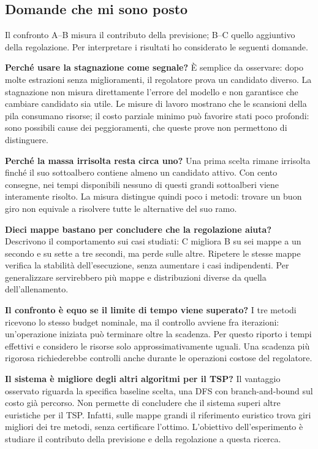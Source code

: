 \subsection*{Domande che mi sono posto}

Il confronto A--B misura il contributo della previsione; B--C quello
aggiuntivo della regolazione. Per interpretare i risultati ho considerato
le seguenti domande.

\textbf{Perché usare la stagnazione come segnale?}
È semplice da osservare: dopo molte estrazioni senza miglioramenti,
il regolatore prova un candidato diverso. La stagnazione non misura
direttamente l'errore del modello e non garantisce che cambiare candidato
sia utile. Le misure di lavoro mostrano che le scansioni della pila consumano risorse; il costo parziale
minimo può favorire stati poco profondi: sono possibili cause dei
peggioramenti, che queste prove non permettono di distinguere.

\textbf{Perché la massa irrisolta resta circa uno?}
Una prima scelta rimane irrisolta finché il suo sottoalbero contiene
almeno un candidato attivo. Con cento consegne, nei tempi disponibili
nessuno di questi grandi sottoalberi viene interamente risolto.
La misura distingue quindi poco i metodi: trovare un buon giro non
equivale a risolvere tutte le alternative del suo ramo.

\textbf{Dieci mappe bastano per concludere che la regolazione aiuta?}
Descrivono il comportamento sui casi studiati: C migliora B su sei mappe
a un secondo e su sette a tre secondi, ma perde sulle altre.
Ripetere le stesse mappe verifica la stabilità dell'esecuzione, senza
aumentare i casi indipendenti. Per generalizzare servirebbero più mappe
e distribuzioni diverse da quella dell'allenamento.

\textbf{Il confronto è equo se il limite di tempo viene superato?}
I tre metodi ricevono lo stesso budget nominale, ma il controllo avviene
fra iterazioni: un'operazione iniziata può terminare oltre la scadenza.
Per questo riporto i tempi effettivi e considero le risorse solo
approssimativamente uguali. Una scadenza più rigorosa richiederebbe
controlli anche durante le operazioni costose del regolatore.

\textbf{Il sistema è migliore degli altri algoritmi per il TSP?}
Il vantaggio osservato riguarda la specifica baseline scelta, una DFS
con branch-and-bound sul costo già percorso. Non permette di concludere
che il sistema superi altre euristiche per il TSP. Infatti, sulle mappe
grandi il riferimento euristico trova giri migliori dei tre metodi,
senza certificare l'ottimo. L'obiettivo dell'esperimento è studiare il
contributo della previsione e della regolazione a questa ricerca.
